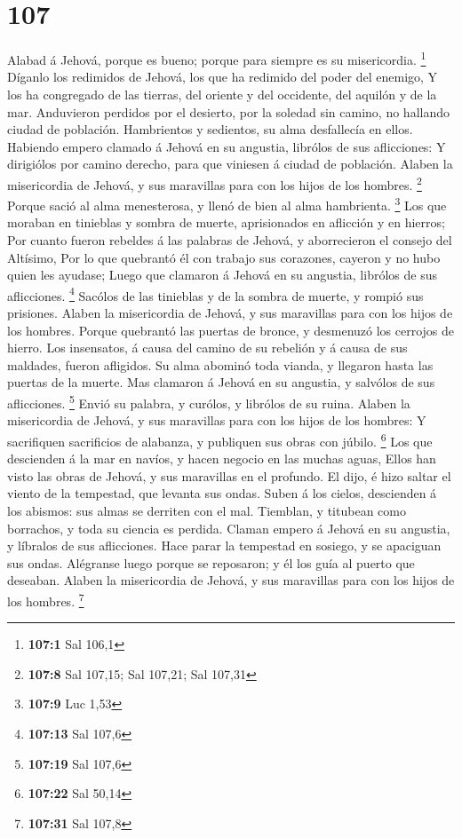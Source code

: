 \hypertarget{section-106}{%
\section{107}\label{section-106}}

 Alabad á Jehová, porque es bueno; porque para siempre es su
misericordia. \footnote{\textbf{107:1} Sal 106,1}  Díganlo
los redimidos de Jehová, los que ha redimido del poder del enemigo,
 Y los ha congregado de las tierras, del oriente y del
occidente, del aquilón y de la mar.  Anduvieron perdidos por
el desierto, por la soledad sin camino, no hallando ciudad de población.
 Hambrientos y sedientos, su alma desfallecía en ellos.
 Habiendo empero clamado á Jehová en su angustia, librólos
de sus aflicciones:  Y dirigiólos por camino derecho, para
que viniesen á ciudad de población.  Alaben la misericordia
de Jehová, y sus maravillas para con los hijos de los hombres.
\footnote{\textbf{107:8} Sal 107,15; Sal 107,21; Sal 107,31}
 Porque sació al alma menesterosa, y llenó de bien al alma
hambrienta. \footnote{\textbf{107:9} Luc 1,53}  Los que
moraban en tinieblas y sombra de muerte, aprisionados en aflicción y en
hierros;  Por cuanto fueron rebeldes á las palabras de
Jehová, y aborrecieron el consejo del Altísimo,  Por lo que
quebrantó él con trabajo sus corazones, cayeron y no hubo quien les
ayudase;  Luego que clamaron á Jehová en su angustia,
librólos de sus aflicciones. \footnote{\textbf{107:13} Sal 107,6}
 Sacólos de las tinieblas y de la sombra de muerte, y
rompió sus prisiones.  Alaben la misericordia de Jehová, y
sus maravillas para con los hijos de los hombres.  Porque
quebrantó las puertas de bronce, y desmenuzó los cerrojos de hierro.
 Los insensatos, á causa del camino de su rebelión y á
causa de sus maldades, fueron afligidos.  Su alma abominó
toda vianda, y llegaron hasta las puertas de la muerte. 
Mas clamaron á Jehová en su angustia, y salvólos de sus aflicciones.
\footnote{\textbf{107:19} Sal 107,6}  Envió su palabra, y
curólos, y librólos de su ruina.  Alaben la misericordia de
Jehová, y sus maravillas para con los hijos de los hombres:
 Y sacrifiquen sacrificios de alabanza, y publiquen sus
obras con júbilo. \footnote{\textbf{107:22} Sal 50,14}  Los
que descienden á la mar en navíos, y hacen negocio en las muchas aguas,
 Ellos han visto las obras de Jehová, y sus maravillas en
el profundo.  El dijo, é hizo saltar el viento de la
tempestad, que levanta sus ondas.  Suben á los cielos,
descienden á los abismos: sus almas se derriten con el mal.
 Tiemblan, y titubean como borrachos, y toda su ciencia es
perdida.  Claman empero á Jehová en su angustia, y líbralos
de sus aflicciones.  Hace parar la tempestad en sosiego, y
se apaciguan sus ondas.  Alégranse luego porque se
reposaron; y él los guía al puerto que deseaban.  Alaben la
misericordia de Jehová, y sus maravillas para con los hijos de los
hombres. \footnote{\textbf{107:31} Sal 107,8}

